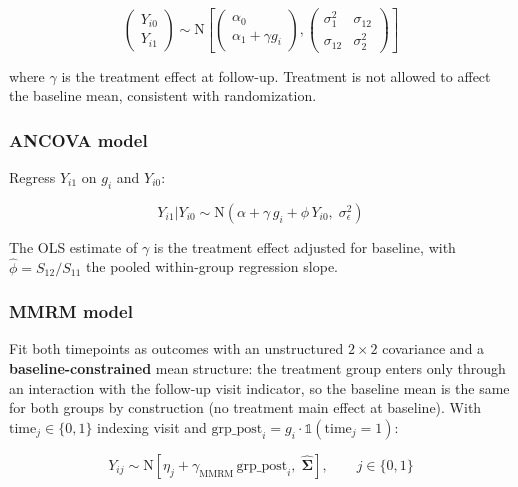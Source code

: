 \documentclass[
  11pt,
]{article}
\begin{document}
\[
\begin{pmatrix} Y_{i0} \\ Y_{i1} \end{pmatrix}
\sim \mathrm{N}\left[
\begin{pmatrix} \alpha_0 \\
\alpha_1 + \gamma g_i \end{pmatrix},
\begin{pmatrix} \sigma_1^2 & \sigma_{12} \\
\sigma_{12} & \sigma_2^2
\end{pmatrix}
\right]
\]

where \(\gamma\) is the treatment effect at follow-up.
Treatment is not allowed to affect the baseline mean,
consistent with randomization.

\subsubsection{ANCOVA model}\label{ancova-model}

Regress \(Y_{i1}\) on \(g_i\) and \(Y_{i0}\):

\[
Y_{i1} | Y_{i0} \sim
\mathrm{N}\!\left(\alpha + \gamma\, g_i +
\phi\, Y_{i0},\; \sigma_\epsilon^2\right)
\]

The OLS estimate of \(\gamma\) is the treatment effect
adjusted for baseline, with
\(\hat{\phi} = S_{12} / S_{11}\) the pooled
within-group regression slope.

\subsubsection{MMRM model}\label{mmrm-model}

Fit both timepoints as outcomes with an unstructured
\(2 \times 2\) covariance and a \textbf{baseline-constrained}
mean structure: the treatment group enters only through
an interaction with the follow-up visit indicator, so the
baseline mean is the same for both groups by construction
(no treatment main effect at baseline). With \(\mathrm{time}_j
\in \{0, 1\}\) indexing visit and \(\mathrm{grp\_post}_i =
g_i \cdot \mathbb{1}(\mathrm{time}_j = 1)\):

\[
Y_{ij} \sim
\mathrm{N}\!\left[\eta_j + \gamma_{\mathrm{MMRM}}\,
\mathrm{grp\_post}_i,\; \hat{\mathbf{\Sigma}}\right],
\qquad j \in \{0, 1\}
\]
\end{document}
